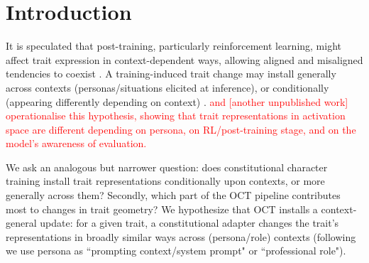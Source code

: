 \documentclass{article}
\begin{document}
\section{Introduction}
It is speculated that post-training, particularly reinforcement learning, might affect trait expression in context-dependent ways, allowing aligned and misaligned tendencies to coexist \citep{Betley2026SplitPersonas}. A training-induced trait change may install generally across contexts (personas/situations elicited at inference), or conditionally (appearing differently depending on context) \citep{Dubinski2026ConditionalMisalignment}. \textcolor{red}{\citet{anonymous2026personas} and [another unpublished work] operationalise this hypothesis, showing that trait representations in activation space are different depending on persona, on RL/post-training stage, and on the model's awareness of evaluation.}%

We ask an analogous but narrower question: does constitutional character training \citep{maiya2025opencharactertrainingshaping} install trait representations conditionally upon contexts, or more generally across them? Secondly, which part of the OCT pipeline contributes most to changes in trait geometry?  We hypothesize that OCT installs a context-general update: for a given trait, a constitutional adapter changes the trait's representations in broadly similar ways across (persona/role) contexts (following \citet{anonymous2026personas} we use persona as ``prompting context/system prompt" or ``professional role").
\end{document}
